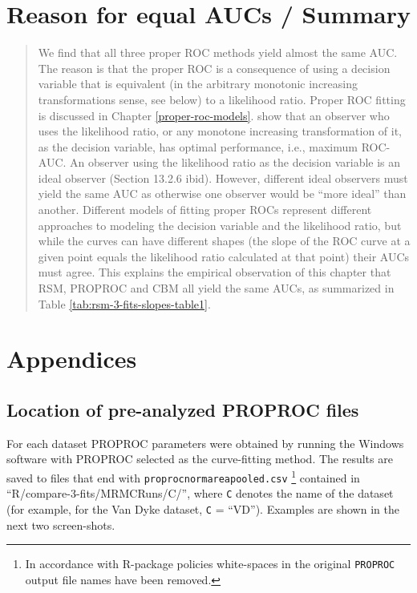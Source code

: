 \documentclass[
]{book}
\begin{document}
\hypertarget{rsm-3-fits-discussion-summary}{%
\section{Reason for equal AUCs / Summary}\label{rsm-3-fits-discussion-summary}}

\begin{quote}
We find that all three proper ROC methods yield almost the same AUC. The reason is that the proper ROC is a consequence of using a decision variable that is equivalent (in the arbitrary monotonic increasing transformations sense, see below) to a likelihood ratio. Proper ROC fitting is discussed in Chapter \ref{proper-roc-models}. \citep{barrett2013foundations} show that an observer who uses the likelihood ratio, or any monotone increasing transformation of it, as the decision variable, has optimal performance, i.e., maximum ROC-AUC. An observer using the likelihood ratio as the decision variable is an ideal observer (Section 13.2.6 ibid). However, different ideal observers must yield the same AUC as otherwise one observer would be ``more ideal'' than another. Different models of fitting proper ROCs represent different approaches to modeling the decision variable and the likelihood ratio, but while the curves can have different shapes (the slope of the ROC curve at a given point equals the likelihood ratio calculated at that point) their AUCs must agree. This explains the empirical observation of this chapter that RSM, PROPROC and CBM all yield the same AUCs, as summarized in Table \ref{tab:rsm-3-fits-slopes-table1}.
\end{quote}

\hypertarget{rsm-3-fits-appendices}{%
\section{Appendices}\label{rsm-3-fits-appendices}}

\hypertarget{rsm-3-fits-one-dataset-proproc}{%
\subsection{Location of pre-analyzed PROPROC files}\label{rsm-3-fits-one-dataset-proproc}}

For each dataset PROPROC parameters were obtained by running the Windows software with PROPROC selected as the curve-fitting method. The results are saved to files that end with \texttt{proprocnormareapooled.csv} \footnote{In accordance with R-package policies white-spaces in the original \texttt{PROPROC} output file names have been removed.} contained in ``R/compare-3-fits/MRMCRuns/C/'', where \texttt{C} denotes the name of the dataset (for example, for the Van Dyke dataset, \texttt{C} = ``VD''). Examples are shown in the next two screen-shots.
\end{document}
